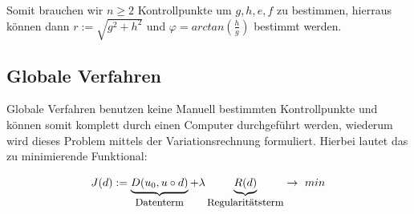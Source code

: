 \documentclass{article}
\theoremstyle{plain}
\theoremstyle{definition}
\numberwithin{equation}{section}
\begin{document}
Somit brauchen wir $n \geq 2$ Kontrollpunkte um $g,h,e,f$ zu bestimmen, hierraus können dann $r:=\sqrt{g^2+h^2}$ und $\varphi=arctan(\frac{h}{g})$ bestimmt werden.

\subsection{Globale Verfahren}

Globale Verfahren benutzen keine Manuell bestimmten Kontrollpunkte und können somit komplett durch einen Computer durchgeführt werden, wiederum wird dieses Problem mittels der Variationsrechnung formuliert.
Hierbei lautet das zu minimierende Funktional:

\[J(d):=\underbrace{D(u_0,u \circ d)}_{\text{\small Datenterm}} + \lambda \underbrace{R(d)}_{\text{\small Regularitätsterm}} \to \ min\]
\end{document}
